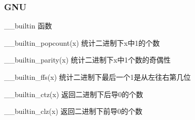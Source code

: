\documentclass{beamer}
\begin{document}
  \begin{frame}
    \frametitle{GNU}

    \begin{block}{\_\_builtin 函数}

      \_\_builtin\_popcount(x) 统计二进制下x中1的个数

      \vspace*{1\baselineskip}
      
      \_\_builtin\_parity(x) 统计二进制下x中1个数的奇偶性
      
      \vspace*{1\baselineskip}
      
      \_\_builtin\_ffs(x) 统计二进制下最后一个1是从左往右第几位
      
      \vspace*{1\baselineskip}
      
      \_\_builtin\_ctz(x) 返回二进制下后导0的个数
      
      \vspace*{1\baselineskip}
      
      \_\_builtin\_clz(x) 返回二进制下前导0的个数
    \end{block}
    
  \end{frame}

\end{document}
